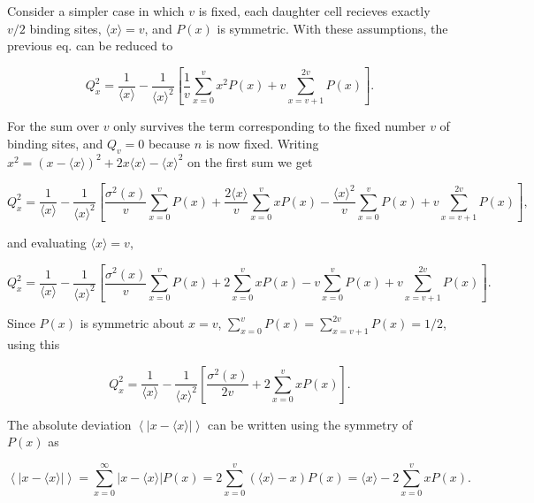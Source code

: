 Consider a simpler case in which $v$ is fixed, each daughter cell recieves exactly $v/2$ binding sites, $\langle x\rangle = v$, and $P(x)$ is symmetric. With these assumptions, the previous eq. can be reduced to

\begin{equation*}
  Q_x^2 = \frac{1}{\langle x\rangle} - \frac{1}{\langle x\rangle^2}\left[\frac{1}{v}\sum_{x=0}^vx^2P(x)+v\sum_{x=v+1}^{2v}P(x)\right].
\end{equation*}

For the sum over $v$ only survives the term corresponding to the fixed number $v$ of binding sites, and $Q_v=0$ because $n$ is now fixed. Writing $x^2 = \left(x-\langle x\rangle\right)^2 + 2x\langle x\rangle - \langle x\rangle^2$ on the first sum we get 

\begin{equation*}
  Q_x^2 = \frac{1}{\langle x\rangle}-\frac{1}{\langle x\rangle^2}\left[\frac{\sigma^2(x)}{v}\sum_{x=0}^vP(x)+\frac{2\langle x\rangle}{v}\sum_{x=0}^vxP(x)-\frac{\langle x\rangle^2}{v}\sum_{x=0}^vP(x)+v\sum_{x=v+1}^{2v}P(x)\right],
\end{equation*}

and evaluating $\langle x\rangle = v$,

\begin{equation*}
  Q_x^2 = \frac{1}{\langle x\rangle}-\frac{1}{\langle x\rangle^2}\left[\frac{\sigma^2(x)}{v}\sum_{x=0}^vP(x)+2\sum_{x=0}^vxP(x)-v\sum_{x=0}^vP(x)+v\sum_{x=v+1}^{2v}P(x)\right].
\end{equation*}

Since $P(x)$ is symmetric about $x=v$, $\sum_{x=0}^vP(x) = \sum_{x=v+1}^{2v}P(x) = 1/2$, using this

\begin{equation}
  \label{eq:div-spindles_1}
  Q_x^2 = \frac{1}{\langle x\rangle}-\frac{1}{\langle x\rangle^2}\left[\frac{\sigma^2(x)}{2v}+2\sum_{x=0}^vxP(x)\right].
\end{equation}

The absolute deviation $\left\langle\left|x-\langle x\rangle\right|\right\rangle$ can be written using the symmetry of $P(x)$ as

\begin{equation*}
  \left\langle\left|x-\langle x\rangle\right|\right\rangle = \sum_{x=0}^\infty\left|x-\langle x\rangle\right|P(x) = 2\sum_{x=0}^v\left(\langle x\rangle-x\right)P(x) = \langle x\rangle-2\sum_{x=0}^vxP(x).
\end{equation*}

